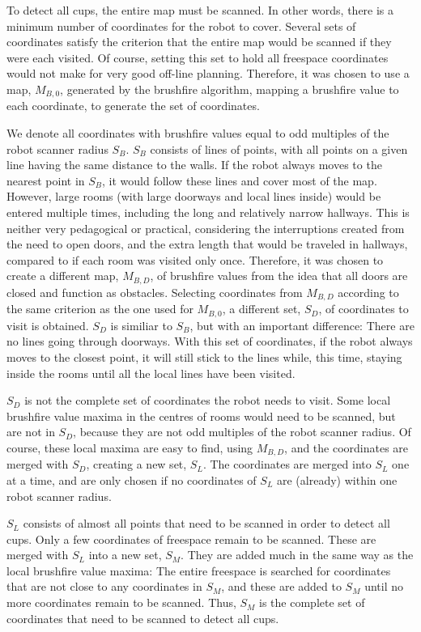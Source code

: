 To detect all cups, the entire map must be scanned.
In other words, there is a minimum number of coordinates for the robot to cover.
Several sets of coordinates satisfy the criterion that the entire map would be scanned if they were each visited.
Of course, setting this set to hold all freespace coordinates would not make for very good off-line planning.
Therefore, it was chosen to use a map, \(M_{B,0}\), generated by the brushfire algorithm,
mapping a brushfire value to each coordinate, to generate the set of coordinates.

We denote all coordinates with brushfire values equal to odd multiples of the robot scanner radius \(S_{B}\).
\(S_{B}\) consists of lines of points, with all points on a given line having the same distance to the walls.
If the robot always moves to the nearest point in \(S_{B}\),
it would follow these lines and cover most of the map.
However, large rooms (with large doorways and local lines inside) would be entered multiple times,
including the long and relatively narrow hallways.
This is neither very pedagogical or practical, considering the interruptions created
from the need to open doors, and the extra length that would be traveled
in hallways, compared to if each room was visited only once.
Therefore, it was chosen to create a different map, \(M_{B,D}\), of brushfire values from the idea
that all doors are closed and function as obstacles.
Selecting coordinates from \(M_{B,D}\) according to the same criterion as the one used for \(M_{B,0}\),
a different set, \(S_{D}\), of coordinates to visit is obtained.
\(S_{D}\) is similiar to \(S_{B}\), but with an important difference:
There are no lines going through doorways.
With this set of coordinates, if the robot always moves to the closest point,
it will still stick to the lines while, this time, staying inside the rooms until all the local lines
have been visited.

\(S_{D}\) is not the complete set of coordinates the robot needs to visit.
Some local brushfire value maxima in the centres of rooms would need to be scanned,
but are not in \(S_{D}\), because they are not odd multiples of the robot scanner radius.
Of course, these local maxima are easy to find, using \(M_{B,D}\), and the coordinates
are merged with \(S_{D}\), creating a new set, \(S_{L}\).
The coordinates are merged into \(S_{L}\) one at a time, and are only chosen if no coordinates
of \(S_{L}\) are (already) within one robot scanner radius.

\(S_{L}\) consists of almost all points that need to be scanned in order to detect all cups.
Only a few coordinates of freespace remain to be scanned. These are merged with \(S_{L}\)
into a new set, \(S_{M}\).
They are added much in the same way as the local brushfire value maxima:
The entire freespace is searched for coordinates that are not close to any coordinates in \(S_{M}\),
and these are added to \(S_{M}\) until no more coordinates remain to be scanned.
Thus, \(S_{M}\) is the complete set of coordinates that need to be scanned to detect all cups.



